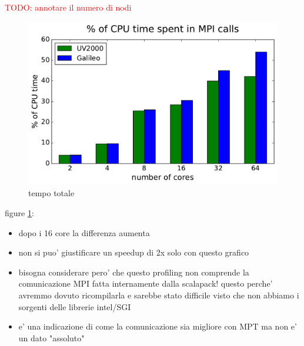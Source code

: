\documentclass[a4paper,12pt]{article}
\newcommand\mynotes[1]{\begin{flushright}

\textcolor{red}{TODO: #1}\end{flushright}}
\begin{document}
\mynotes{annotare il numero di nodi}

\newpage
\begin{figure}[hhh!]
\centerline{ \includegraphics[width=0.7\linewidth]{arch_mpi_perc.pdf}	}
	\caption{tempo totale}
	\label{fig:archMpiPerc}
\end{figure}


figure \ref{fig:archMpiPerc}: 
\begin{itemize}
	\item dopo i 16 core la differenza aumenta
	\item non si puo' giustificare un speedup di 2x solo con questo grafico
	\item bisogna considerare pero' che questo profiling non comprende la comunicazione MPI fatta internamente dalla scalapack! questo perche' avremmo dovuto ricompilarla e sarebbe stato difficile visto che non abbiamo i sorgenti delle librerie intel/SGI
	\item e' una indicazione di come la comunicazione sia migliore con MPT ma non e' un dato "assoluto"
	
\end{itemize}
\end{document}
